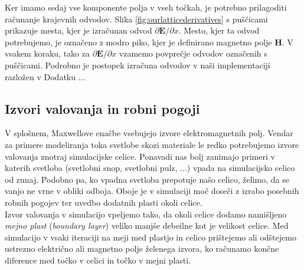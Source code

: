 \documentclass[longbibliography,slovene,a4paper,12pt]{book}
\begin{document}
Ker imamo sedaj vse komponente polja v vseh točkah, je potrebno prilagoditi računanje krajevnih odvodov. Slika \ref{fig:ourlatticederivatives} s puščicami prikazuje mesta, kjer je izračunan odvod $\partial \mathbf{E}/\partial x$. Mesto, kjer ta odvod potrebujemo, je označeno z modro piko, kjer je definirano magnetno polje $\mathbf{H}$. V vsakem koraku, tako za $\partial \mathbf{E}/\partial x$ 
vzamemo povprečje odvodov označenih s puščicami. Podrobno je postopek izračuna odvodov v naši implementaciji razložen v Dodatku ...

\subsection{Izvori valovanja in robni pogoji}

V splošnem, Maxwellove enačbe vsebujejo izvore elektromagnetnih polj. Vendar za primere modeliranja toka svetlobe skozi materiale le redko potrebujemo izvore valovanja znotraj simulacijske celice. Ponavadi nas bolj zanimajo primeri v katerih svetloba (svetlobni snop, svetlobni pulz, ...) vpada na simulacijsko celico od zunaj. Podobno pa, ko vpadna svetloba prepotuje našo celico, želimo, da se vanjo ne vrne v obliki odboja. Oboje je v simulaciji moč doseči z izrabo posebnih robnih pogojev ter uvedbo dodatnih plasti okoli celice.\\

Izvor valovanja v simulacijo vpeljemo tako, da okoli celice dodamo namišljeno \emph{mejno plast} (\emph{boundary layer}) veliko manjše debeilne kot je velikost celice. Med simulacijo v vsaki iteraciji na meji med plastjo in celico prištejemo ali odštejemo ustrezno električno ali magnetno polje želenega izvora, ko računamo končne diference med točko v celici in točko v mejni plasti. \\
\end{document}
